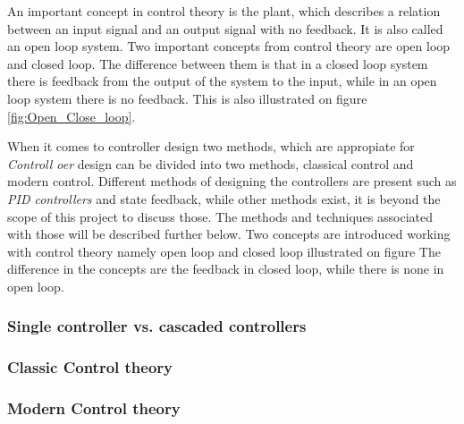 \documentclass[../../main.tex]{subfiles}
\begin{document}
An important concept in control theory is the plant, which describes a relation between an input signal and an output signal with no feedback. It is also called an open loop system.   
Two important concepts from control theory are open loop and closed loop. The difference between them is that in a closed loop system there is feedback from the output of the system to the input, while in an open loop system there is no feedback. This is also illustrated on figure \ref{fig:Open_Close_loop}.


When it comes to controller design two methods, which are appropiate for
\textit{Controll oer} design can be divided into two methods, classical control and modern control. Different methods of designing the controllers are present such as \textit{PID controllers} and state feedback, while other methods exist, it is beyond the scope of this project to discuss those. The methods and techniques associated with those will be described further below. Two concepts are introduced working with control theory namely open loop and closed loop illustrated on figure  The difference in the concepts are the feedback in closed loop, while there is none in open loop.


\subsubsection*{Single controller vs. cascaded controllers}

\subsubsection*{Classic Control theory}

\subsubsection*{Modern Control theory}

\end{document}
